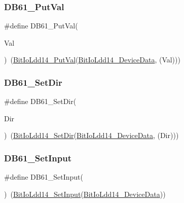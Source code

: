 \subsubsection{\texorpdfstring{D\+B61\+\_\+\+Put\+Val}{DB61\_PutVal}}
{\footnotesize\ttfamily \#define D\+B61\+\_\+\+Put\+Val(\begin{DoxyParamCaption}\item[{}]{Val }\end{DoxyParamCaption})~(\hyperlink{group___bit_io_ldd14__module_ga5b43e570ab8bb71e3fb5dcbfdfb5f5f6}{Bit\+Io\+Ldd14\+\_\+\+Put\+Val}(\hyperlink{group___bit_io_ldd14__module_ga73f5611a097a03f5f36a403f6b6e9fff}{Bit\+Io\+Ldd14\+\_\+\+Device\+Data}, (Val)))}

\mbox{\label{group___d_b61__module_gac843762a13f4003ebb4afd75094db66d}} 
\subsubsection{\texorpdfstring{D\+B61\+\_\+\+Set\+Dir}{DB61\_SetDir}}
{\footnotesize\ttfamily \#define D\+B61\+\_\+\+Set\+Dir(\begin{DoxyParamCaption}\item[{}]{Dir }\end{DoxyParamCaption})~(\hyperlink{group___bit_io_ldd14__module_ga355321bc14f2b7d48f987262e47ec774}{Bit\+Io\+Ldd14\+\_\+\+Set\+Dir}(\hyperlink{group___bit_io_ldd14__module_ga73f5611a097a03f5f36a403f6b6e9fff}{Bit\+Io\+Ldd14\+\_\+\+Device\+Data}, (Dir)))}

\mbox{\label{group___d_b61__module_ga74ea0e3e995e69774dcb2e39d82d3937}} 
\subsubsection{\texorpdfstring{D\+B61\+\_\+\+Set\+Input}{DB61\_SetInput}}
{\footnotesize\ttfamily \#define D\+B61\+\_\+\+Set\+Input(\begin{DoxyParamCaption}{ }\end{DoxyParamCaption})~(\hyperlink{group___bit_io_ldd14__module_gaa57898006e1c42d880e2a66dbcaecae7}{Bit\+Io\+Ldd14\+\_\+\+Set\+Input}(\hyperlink{group___bit_io_ldd14__module_ga73f5611a097a03f5f36a403f6b6e9fff}{Bit\+Io\+Ldd14\+\_\+\+Device\+Data}))}

